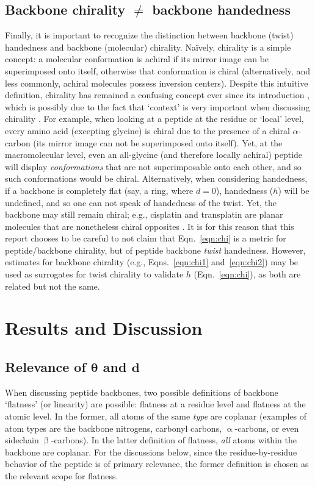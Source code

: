 \documentclass[fleqn,10pt,lineno]{wlpeerj} %
\newcommand{\n}[1]{{\color{black}#1}} %
\newcommand{\Eqn}[1]{Eqn.~\ref{#1}}
\newcommand{\Eqns}[1]{Eqns.~\ref{#1}}
\newcommand{\h}{h}
\begin{document}
\subsection*{Backbone chirality $\bm\neq$ backbone handedness}
Finally, it is important to recognize the distinction between backbone (twist) handedness and backbone (molecular) chirality. Na{\"i}vely, chirality is a simple concept: a molecular conformation is achiral if its mirror image can be superimposed onto itself, otherwise that conformation is chiral \citep{Gold1997} (alternatively, and less commonly, achiral molecules possess inversion centers). Despite this intuitive definition, chirality has remained a confusing concept ever since its introduction \citep{Bentley2010,Wallentin2009}, which is possibly due to the fact that `context' is very important when discussing chirality \citep{Mislow2002}. For example, when looking at a peptide at the residue or `local' level, every amino acid (excepting glycine) is chiral due to the presence of a chiral $\alpha$-carbon (its mirror image can not be superimposed onto itself). Yet, at the macromolecular level, even an all-glycine (and therefore locally achiral) peptide will display {\em conformations} that are not superimposable onto each other, and so such conformations would be chiral. Alternatively, when considering handedness, if a backbone is completely flat (say, a ring, where $d=0$), handedness ($h$) will be undefined, and so one can not speak of handedness of the twist. Yet, the backbone may still remain chiral; e.g., cisplatin and transplatin are planar molecules that are nonetheless chiral opposites \citep{Testa2013}. It is for this reason that this report chooses to be careful to not claim that \Eqn{eqn:chi} is a metric for peptide/backbone chirality, but of peptide backbone {\em twist} handedness. However, estimates for backbone chirality (e.g., \Eqns{eqn:chi1} and~\ref{eqn:chi2}) may be used as surrogates for twist chirality to validate $\h$ (\Eqn{eqn:chi}), as both are related but not the same.

\section*{Results and Discussion}

\subsection*{Relevance of $\bm \theta$ and $\bm d$}

When discussing peptide backbones, two possible definitions of backbone `flatness' (or linearity) are possible: flatness at a residue level and flatness at the atomic level. In the former, all atoms of the same {\em type} are coplanar (examples of atom types are the backbone nitrogens, carbonyl carbons, $\upalpha$-carbons, or even sidechain $\upbeta$-carbons). In the latter \n{definition of flatness}, {\em all} atoms within the backbone are coplanar. For the discussions below, \n{since the} residue-by-residue behavior of the peptide is of primary relevance, the former definition is chosen as the relevant scope for flatness. 
\end{document}
